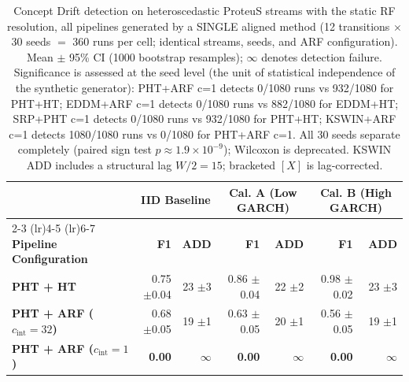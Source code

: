 \begin{table}[t]
  \centering
  \caption{Concept Drift detection on heteroscedastic ProteuS streams with the static RF resolution, all pipelines generated by a SINGLE aligned method (12 transitions $\times$ 30 seeds $=$ 360 runs per cell; identical streams, seeds, and ARF configuration). Mean $\pm$ 95\% CI (1000 bootstrap resamples); $\infty$ denotes detection failure. Significance is assessed at the seed level (the unit of statistical independence of the synthetic generator): PHT+ARF c=1 detects 0/1080 runs vs 932/1080 for PHT+HT; EDDM+ARF c=1 detects 0/1080 runs vs 882/1080 for EDDM+HT; SRP+PHT c=1 detects 0/1080 runs vs 932/1080 for PHT+HT; KSWIN+ARF c=1 detects 1080/1080 runs vs 0/1080 for PHT+ARF c=1. All 30 seeds separate completely (paired sign test $p \approx 1.9\times10^{-9}$); Wilcoxon is deprecated. KSWIN ADD includes a structural lag $W/2 = 15$; bracketed $[X]$ is lag-corrected.}
  \label{tab:results_concept}
  \begin{tabular}{@{}lrrrrrr@{}}
    \toprule
                                                   & \multicolumn{2}{c}{\textbf{IID Baseline}} & \multicolumn{2}{c}{\textbf{Cal. A (Low GARCH)}} & \multicolumn{2}{c}{\textbf{Cal. B (High GARCH)}}                                                                     \\
    \cmidrule(lr){2-3} \cmidrule(lr){4-5} \cmidrule(lr){6-7}
    \textbf{Pipeline Configuration}                & \textbf{F1}                               & \textbf{ADD}                                    & \textbf{F1}                                      & \textbf{ADD}       & \textbf{F1}             & \textbf{ADD}       \\
    \midrule
    \textbf{PHT + HT}                              & 0.75 {\small $\pm$0.04}                   & 23 {\small $\pm$3}                              & 0.86 {\small $\pm$0.04}                          & 22 {\small $\pm$2} & 0.98 {\small $\pm$0.02} & 23 {\small $\pm$3} \\
    \textbf{PHT + ARF ($c_{\mathrm{int}} = 32$)}   & 0.68 {\small $\pm$0.05}                   & 19 {\small $\pm$1}                              & 0.63 {\small $\pm$0.05}                          & 20 {\small $\pm$1} & 0.56 {\small $\pm$0.05} & 19 {\small $\pm$1} \\
    \textbf{PHT + ARF ($c_{\mathrm{int}} = 1$)}    & \textbf{0.00}                             & $\infty$                                        & \textbf{0.00}                                    & $\infty$           & \textbf{0.00}           & $\infty$           \\

\end{tabular}
\end{table}
